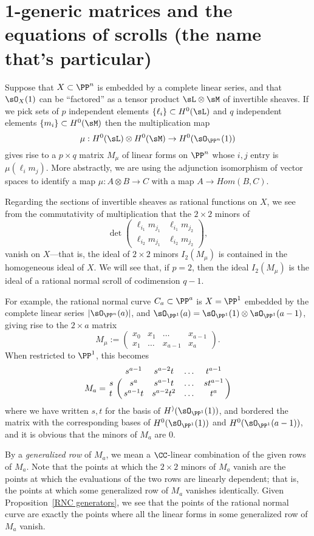 \section{1-generic matrices and the equations of scrolls
(the name that's particular)}\label{particular name}

Suppose that $X \subset \PP^n$ is embedded by a complete linear series, and that
$\sO_X(1)$ can be ``factored'' as a tensor product $\sL\otimes \sM$ of invertible sheaves. If we pick sets of $p$ independent elements $\{\ell_i\}\subset H^0(\sL)$ and  $q$ independent elements $\{m_i\} \subset H^0(\sM)$ then the multiplication map 
$$
\mu: H^0(\sL) \otimes H^0(\sM) \to H^0(\sO_{\PP^n}(1))
$$
 gives rise to 
a $p\times q$ matrix $M_\mu$ of linear forms on $\PP^n$ whose $i,j$ entry is $\mu(\ell_im_j)$.
More abstractly, we are using the adjunction isomorphism of vector spaces
to identify a map $\mu: A\otimes B \to C$ with a map $A \to Hom(B,C)$.

Regarding the sections of invertible sheaves as rational functions on $X$, we see from the commutativity of
multiplication that the $2\times 2$ minors
of 
$$
\det \begin{pmatrix}
\ell_{i_1}m_{j_1} & \ell_{i_1}m_{j_2}\\
\ell_{i_2}m_{j_1} &\ell_{i_2}m_{j_2}  
\end{pmatrix},
$$
vanish on $X$---that is, the ideal of $2\times 2$ minors $I_2(M_\mu)$ is contained in the homogeneous ideal
of $X$. 
We will see that, if $p=2$, then the ideal $I_2(M_\mu)$
is the ideal of a rational normal scroll of codimension $q-1$.

For example, the rational normal curve $C_a\subset \PP^a$ is $X = \PP^1$ embedded by the complete
linear series $|\sO_{\PP^n}(a)|$, and $\sO_{\PP^1}(a) = \sO_{\PP^1}(1)\otimes \sO_{\PP^1}(a-1)$, 
giving rise to the $2\times a$ matrix
$$
M_\mu := 
\begin{pmatrix}
x_0&x_1&\dots&x_{a-1}\\
x_1&\dots&x_{a-1}&x_a
\end{pmatrix}.
$$
When restricted to $\PP^1$, this becomes
$$
M_a = \bordermatrix{
& s^{a-1}&s^{a-2}t&\dots&t^{a-1}\cr
s&  s^{a}& s^{a-1}t&\dots&st^{a-1}\cr
t&  s^{a-1}t& s^{a-2}t^{2}&\dots&t^{a}\cr
}$$
where we have written $s,t$ for the basis of $H^)(\sO_{\PP^1}(1))$, and bordered the matrix
with the corresponding bases of $H^0(\sO_{\PP^1}(1))$ and $H^0(\sO_{\PP^1}(a-1))$, and it is obvious
that the minors of $M_a$ are 0.

By a \emph{generalized row} of $M_{a}$, we mean a $\CC$-linear combination of the given rows of $M_{a}$. Note that the points at which the $2\times 2$ minors of $M_{a}$ vanish are the points at which the evaluations of the two rows are linearly dependent; that is, the points at which some
generalized row of $M_{a}$ vanishes identically. Given Proposition~\ref{RNC generators}, we see that the points of the rational normal curve are exactly the points where all the linear forms in some generalized row
of $M_{a}$ vanish.

